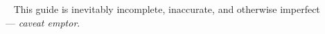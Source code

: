 

\clearpage
\renewcommand\indexname{Subject Index}
\thispagestyle{chapter}
\small
\begin{flushleft}
\printindex
\end{flushleft}
\normalsize

\addtocounter{page}{-1}
\newpage
\addtocounter{page}{+1}

~
\vfill
\thispagestyle{empty}
This guide is inevitably incomplete, inaccurate, and otherwise imperfect \\ {} \hfill   --- \emph{caveat emptor}.

